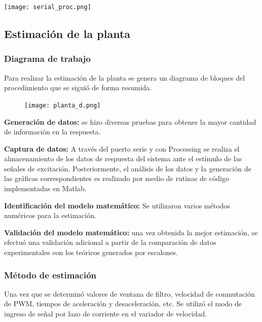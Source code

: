 \begin{center}
    \texttt{[image: serial\_proc.png]}
    \label{fig:Proce}    
\end{center}

\subsection{Estimación de la planta}
    \subsubsection{Diagrama de trabajo}

Para realizar la estimación de la planta se genera un diagrama de bloques del procedimiento que se siguió de forma resumida.

\begin{figure}[htb]
	\centering
	\texttt{[image: planta\_d.png]}
	\label{fig:planta_d}
\end{figure}

 \textbf{Generación de datos:}  se hizo diversas pruebas para obtener la mayor cantidad de información en la respuesta.

 \textbf{Captura de datos:} A través del puerto serie y con Processing se realiza el almacenamiento de los datos de respuesta del sistema ante el estímulo de las señales de excitación. Posteriormente, el análisis de los datos y la generación de las gráficas correspondientes es realizado por medio de rutinas de código implementadas en Matlab.

 \textbf{Identificación del modelo matemático:} Se utilizaron varios métodos numéricos para la estimación.

 \textbf{Validación del modelo matemático:} una vez obtenida la mejor estimación, se efectuó una validación adicional a partir de la comparación de datos experimentales con los teóricos generados por escalones.






    \subsubsection{Método de estimación}

    Una vez que se determinó valores de ventana de filtro, velocidad de conmutación de PWM, tiempos de aceleración y desaceleración, etc. Se utilizó el modo de ingreso de señal por lazo de corriente en el variador de velocidad. 
    
